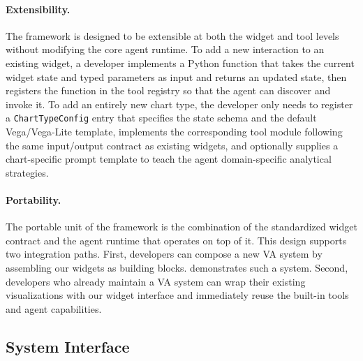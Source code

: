 \paragraph{Extensibility.}
The framework is designed to be extensible at both the widget and tool levels without modifying the core agent runtime.
To add a new interaction to an existing widget, a developer implements a Python function that takes the current widget state and typed parameters as input and returns an updated state, then registers the function in the tool registry so that the agent can discover and invoke it.
To add an entirely new chart type, the developer only needs to register a \texttt{ChartTypeConfig} entry that specifies the state schema and the default Vega/Vega-Lite template, implements the corresponding tool module following the same input/output contract as existing widgets, and optionally supplies a chart-specific prompt template to teach the agent domain-specific analytical strategies.

\paragraph{Portability.}
The portable unit of the framework is the combination of the standardized widget contract and the agent runtime that operates on top of it.
This design supports two integration paths.
First, developers can compose a new VA system by assembling our widgets as building blocks.
 demonstrates such a system.
Second, developers who already maintain a VA system can wrap their existing visualizations with our widget interface and immediately reuse the built-in tools and agent capabilities.

\subsection{System Interface}
\label{sec:system_interface}



